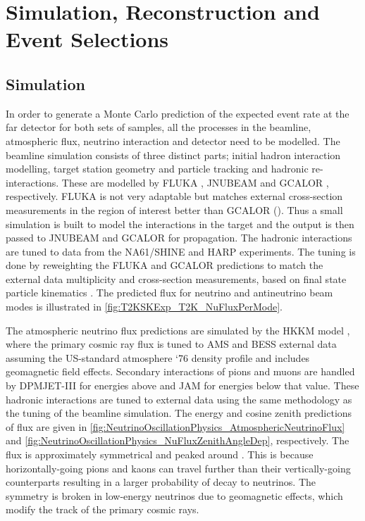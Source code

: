 \chapter{Simulation, Reconstruction and Event Selections}
\label{chap:Selections}

\section{Simulation}
\label{sec:Selections_Simulation}

In order to generate a Monte Carlo prediction of the expected event rate at the far detector for both sets of samples, all the processes in the beamline, atmospheric flux, neutrino interaction and detector need to be modelled. The beamline simulation consists of three distinct parts; initial hadron interaction modelling, target station geometry and particle tracking and hadronic re-interactions. These are modelled by FLUKA \cite{fluka2011}, JNUBEAM \cite{geant3, PhysRevD.87.012001} and GCALOR \cite{gcalor}, respectively. FLUKA is not very adaptable but matches external cross-section measurements in the region of interest better than GCALOR (). Thus a small simulation is built to model the interactions in the target and the output is then passed to JNUBEAM and GCALOR for propagation. The hadronic interactions are tuned to data from the NA61/SHINE \cite{Abgrall_2011, Abgrall_2012, NA61_pions_rep} and HARP \cite{harp} experiments. The tuning is done by reweighting the FLUKA and GCALOR predictions to match the external data multiplicity and cross-section measurements, based on final state particle kinematics \cite{t2k_tn_flux}. The predicted flux for neutrino and antineutrino beam modes is illustrated in \autoref{fig:T2KSKExp_T2K_NuFluxPerMode}.

The atmospheric neutrino flux predictions are simulated by the HKKM model \cite{Honda_2007, Honda:2011}, where the primary cosmic ray flux is tuned to AMS \cite{Blau2002} and BESS \cite{Haino2004} external data assuming the US-standard atmosphere `76 \cite{USStandardAtm} density profile and includes geomagnetic field effects. Secondary interactions of pions and muons are handled by DPMJET-III \cite{Roesler2001} for energies above  and JAM \cite{Niita2006, Honda:2011} for energies below that value. These hadronic interactions are tuned to external data \cite{Sanuki_2002, Achard_2004} using the same methodology as the tuning of the beamline simulation. The energy and cosine zenith predictions of  flux are given in \autoref{fig:NeutrinoOscillationPhysics_AtmosphericNeutrinoFlux} and \autoref{fig:NeutrinoOscillationPhysics_NuFluxZenithAngleDep}, respectively. The flux is approximately symmetrical and peaked around . This is because horizontally-going pions and kaons can travel further than their vertically-going counterparts resulting in a larger probability of decay to neutrinos. The symmetry is broken in low-energy neutrinos due to geomagnetic effects, which modify the track of the primary cosmic rays.

